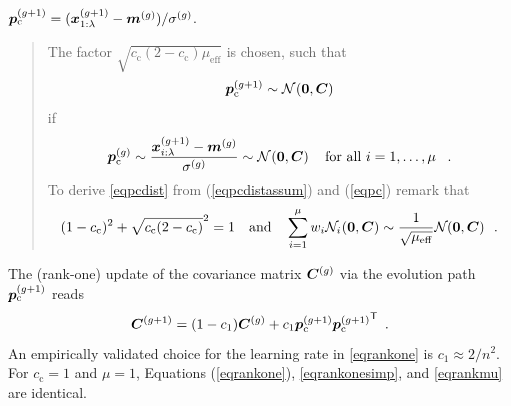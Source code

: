 \documentclass{article} %
\newenvironment{einschub}{%
\begin{small} \begin{quotation}\noindent}{%
  \vspace{0.5ex}\end{quotation}\end{small}%
}
\newcommand{\ve}[1]{\mathchoice{\mbox{\boldmath$\displaystyle#1$}}
  {\mbox{\boldmath$\textstyle#1$}} {\mbox{\boldmath$\scriptstyle#1$}}
  {\mbox{\boldmath$\scriptscriptstyle#1$}}}
\newcommand{\ma}[1]{\mathchoice{\mbox{\boldmath$\displaystyle#1$}}
  {\mbox{\boldmath$\textstyle#1$}} {\mbox{\boldmath$\scriptstyle#1$}}
  {\mbox{\boldmath$\scriptscriptstyle#1$}}}
\newcommand{\T}{\ensuremath{\mathsf{T}}}
\newcommand{\N}{\ensuremath{n}}
\newcommand{\mueff}{\ensuremath{\mu_\mathrm{eff}}}
\newcommand{\summ}[2]{\sum_{#1=1}^{#2}}
\newcommand{\lam}{\ensuremath{\lambda}}
\newcommand{\sigg}{\sigma^{(g)}}
\newcommand{\Cg}{\ensuremath{\ma{C}^{(g)}}}
\newcommand{\Cgg}{\ma{C}^{(g+1)}}
\newcommand{\cc}{\ensuremath{c_\mathrm{c}}}
\newcommand{\pcg}{{\ve{p}_\mathrm{c}^{(g)}}}
\newcommand{\pcgg}{\ve{p}_\mathrm{c}^{(g+1)}}
\newcommand{\xgg}{\ve{x}^{(g+1)}}
\newcommand{\Normal}[1]{{\mathcal N}\hspace{-0.13em}\left(#1\right)}
\newcommand{\Normali}[2][]{{\mathcal N}_{#1}\hspace{-0.13em}\left(#2\right)}
\newcommand{\cone}{\ensuremath{c_1}}
\newcommand{\xmean}{\ensuremath{\ve{m}}}
\newcommand{\xmeang}{\ensuremath{\xmean^{(g)}}}
\newcommand{\eqrefadd}[1]{(\ref{#1})} %
\newcommand{\eqsref}[1]{(\ref{#1})}
\newcommand{\Eqsref}[1]{Equations (\ref{#1})}
\begin{document}
$\pcgg={(\xgg_{1:\lam}-\xmeang)}/{\sigg}$.
\begin{einschub}%
  The factor $\sqrt{\cc(2-\cc)\mueff}$ is chosen, such that
%
\begin{equation}\label{eqpcdist}
  \pcgg\sim\Normal{\ve{0}, \ma{C}}
\end{equation}
if
\begin{equation}\label{eqpcdistassum}
   \pcg\sim\frac{\xgg_{i:\lam}-\xmeang}{\sigg}\sim\Normal{\ve{0},\ma{C}}
   \quad\mbox{for all $i=1,\dots,\mu$ \enspace.} 
\end{equation}
To derive \eqref{eqpcdist} from \eqsref{eqpcdistassum} and
\eqrefadd{eqpc} remark that
%
  \begin{equation}
    (1-\cc)^2 + \sqrt{\cc(2-\cc)}^2 = 1\quad\mbox{and}\quad
    \summ{i}{\mu}w_i\Normali[i]{\ve{0},\ma{C}}\sim\frac{1}{\sqrt{\mueff}}\Normali{\ve{0},\ma{C}} \enspace.
  \end{equation}
\end{einschub}
%
The (rank-one) update of the covariance matrix $\Cg$ via the
evolution path $\pcgg$ reads \cite{Hansen:1996}
\begin{equation}\label{eqrankone}
  \Cgg = (1-\cone)\Cg + \cone\pcgg{\pcgg}^\T \enspace.
\end{equation}
An empirically validated choice for the learning rate in
\eqref{eqrankone} is $\cone\approx{2}/{\N^2}$. For $\cc=1$ and
$\mu=1$, \Eqsref{eqrankone}, \eqref{eqrankonesimp}, and
\eqref{eqrankmu} are identical.
\end{document}
